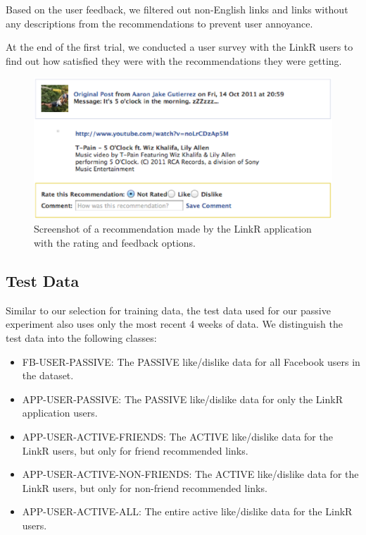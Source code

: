 Based on the user feedback, we filtered out non-English links and links without any descriptions from the recommendations to prevent user annoyance.

At the end of the first trial, we conducted a user survey with the LinkR users to find out how satisfied they were with the recommendations they were getting.

\begin{figure}
\centering
\includegraphics[scale=0.5]{img/linkr_rating.eps}
\caption{Screenshot of a recommendation made by the LinkR application with the rating and feedback options.}
 \label{fig:feedback}
\end{figure}

 
\subsection{Test Data}

Similar to our selection for training data, the test data used for our passive experiment also uses only the most recent 4 weeks of data. We distinguish the test data into the following classes:

\begin{itemize}
\item{FB-USER-PASSIVE: The PASSIVE like/dislike data for all Facebook users in the dataset.}
\item{APP-USER-PASSIVE: The PASSIVE like/dislike data for only the LinkR application users.}
\item{APP-USER-ACTIVE-FRIENDS: The ACTIVE like/dislike data for the LinkR users, but only for friend recommended links.}
\item{APP-USER-ACTIVE-NON-FRIENDS: The ACTIVE like/dislike data for the LinkR users, but only for non-friend recommended links.}
\item{APP-USER-ACTIVE-ALL: The entire active like/dislike data for the LinkR users.}
\end{itemize}

